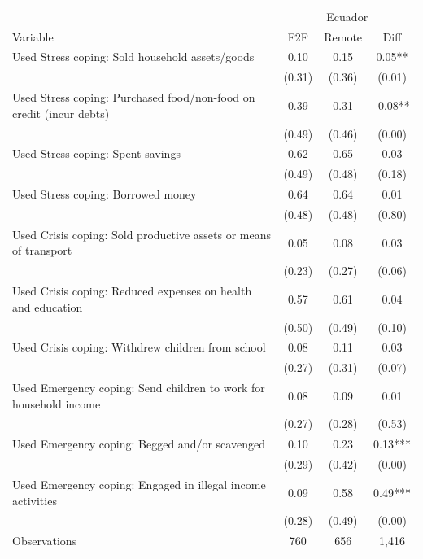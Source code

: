\begin{tabular}{l*{3}c}
\hline\hline
 & \multicolumn{3}{c}{Ecuador}\\ 
Variable & F2F & Remote & Diff \\
\hline
Used Stress coping: Sold household assets/goods&0.10&0.15&0.05**\\
&(0.31)&(0.36)&(0.01)\\
Used Stress coping: Purchased food/non-food on credit (incur debts)&0.39&0.31&-0.08**\\
&(0.49)&(0.46)&(0.00)\\
Used Stress coping: Spent savings&0.62&0.65&0.03\\
&(0.49)&(0.48)&(0.18)\\
Used Stress coping: Borrowed money&0.64&0.64&0.01\\
&(0.48)&(0.48)&(0.80)\\
Used Crisis coping: Sold productive assets or means of transport&0.05&0.08&0.03\\
&(0.23)&(0.27)&(0.06)\\
Used Crisis coping: Reduced expenses on health and education&0.57&0.61&0.04\\
&(0.50)&(0.49)&(0.10)\\
Used Crisis coping: Withdrew children from school&0.08&0.11&0.03\\
&(0.27)&(0.31)&(0.07)\\
Used Emergency coping: Send children to work for household income&0.08&0.09&0.01\\
&(0.27)&(0.28)&(0.53)\\
Used Emergency coping: Begged and/or scavenged&0.10&0.23&0.13***\\
&(0.29)&(0.42)&(0.00)\\
Used Emergency coping: Engaged in illegal income activities&0.09&0.58&0.49***\\
&(0.28)&(0.49)&(0.00)\\
\hline
Observations & 760 & 656 & 1,416 \\
\hline\hline
\end{tabular}
